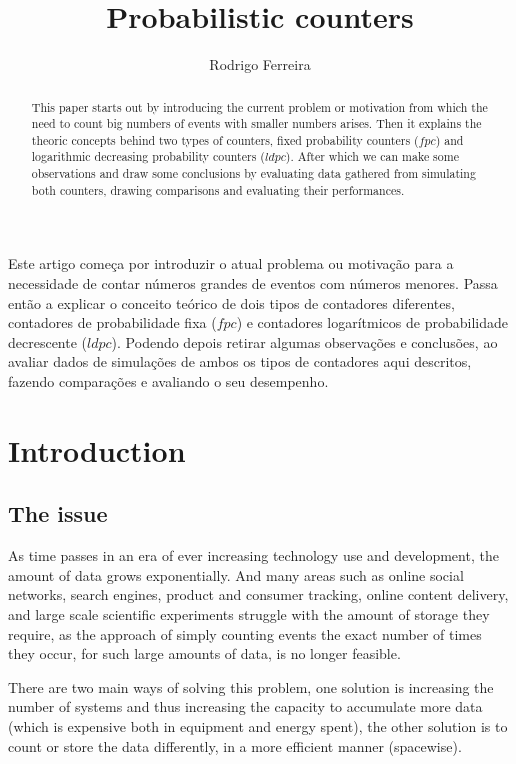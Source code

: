 \documentclass[...]{revdetua}
\begin{document}

\title{Probabilistic counters}
\author{Rodrigo Ferreira} %
\maketitle

\begin{resumo}%
	Este artigo começa por introduzir o atual problema ou motivação para a necessidade de contar números grandes de eventos com números menores.
	Passa então a explicar o conceito teórico de dois tipos de contadores diferentes, contadores de probabilidade fixa ($fpc$) e contadores logarítmicos de probabilidade decrescente ($ldpc$).
	Podendo depois retirar algumas observações e conclusões, ao avaliar dados de simulações de ambos os tipos de contadores aqui descritos, fazendo comparações e avaliando o seu desempenho.
\end{resumo}

\begin{abstract}%
  This paper starts out by introducing the current problem or motivation from which the need to count big numbers of events with smaller numbers arises.
  Then it explains the theoric concepts behind two types of counters, fixed probability counters ($fpc$) and logarithmic decreasing probability counters ($ldpc$).
  After which we can make some observations and draw some conclusions by evaluating data gathered from simulating both counters, drawing comparisons and evaluating their performances.
\end{abstract}
\section{Introduction}
\subsection{The issue}
As time passes in an era of ever increasing technology use and development, the amount of data grows exponentially. And many areas such as online social networks, search engines, product and consumer tracking, online content delivery, and  large scale scientific experiments struggle with the amount of storage they require, as the approach of simply counting events the exact number of times they occur, for such large amounts of data, is no longer feasible.\par
There are two main ways of solving this problem, one solution is increasing the number of systems and thus increasing the capacity to accumulate more data (which is expensive both in equipment and energy spent), the other solution is to count or store the data differently, in a more efficient  manner (spacewise).
\end{document}

